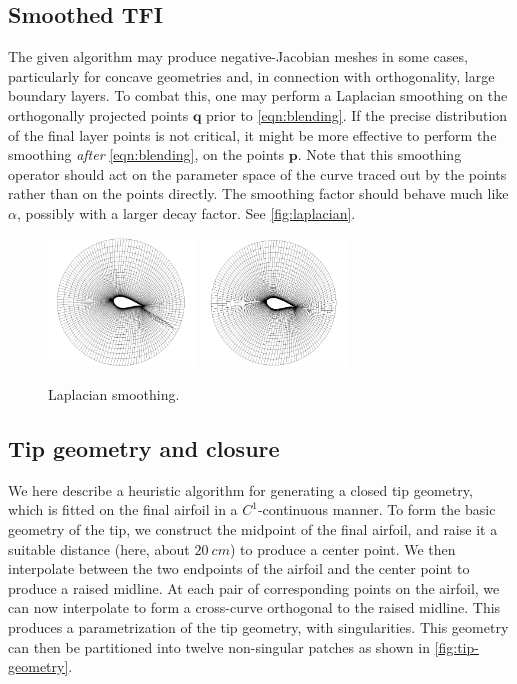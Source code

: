 \documentclass[3p,times,procedia]{elsarticle}
\begin{document}
\subsection{Smoothed TFI}

The given algorithm may produce negative-Jacobian meshes in some cases,
particularly for concave geometries and, in connection with orthogonality, large
boundary layers. To combat this, one may perform a Laplacian smoothing on the
orthogonally projected points $\bm{q}$ prior to \eqref{eqn:blending}. If the
precise distribution of the final layer points is not critical, it might be more
effective to perform the smoothing \emph{after} \eqref{eqn:blending}, on the
points $\bm{p}$. Note that this smoothing operator should act on the parameter
space of the curve traced out by the points rather than on the points directly.
The smoothing factor should behave much like $\alpha$, possibly with a larger
decay factor. See \autoref{fig:laplacian}.

\begin{figure}
  \centering
  \includegraphics[width=0.35\textwidth]{figs/section12}
  \includegraphics[width=0.35\textwidth]{figs/section12_smooth}
  \caption{Laplacian smoothing.}
  \label{fig:laplacian}
\end{figure}

\subsection{Tip geometry and closure}

We here describe a heuristic algorithm for generating a closed tip geometry,
which is fitted on the final airfoil in a $C^1$-continuous manner. To form the
basic geometry of the tip, we construct the midpoint of the final airfoil, and
raise it a suitable distance (here, about $\SI{20}{cm}$) to produce a center
point. We then interpolate between the two endpoints of the airfoil and the
center point to produce a raised midline. At each pair of corresponding points
on the airfoil, we can now interpolate to form a cross-curve orthogonal to the
raised midline. This produces a parametrization of the tip geometry, with
singularities. This geometry can then be partitioned into twelve non-singular
patches as shown in \autoref{fig:tip-geometry}.
\end{document}
